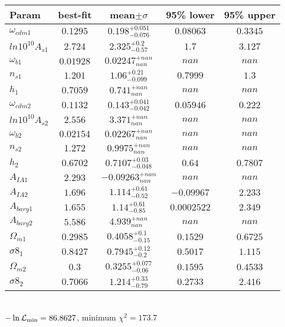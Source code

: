 \begin{tabular}{|l|c|c|c|c|} 
 \hline 
Param & best-fit & mean$\pm\sigma$ & 95\% lower & 95\% upper \\ \hline 
$\omega_{cdm 1 }$ &$0.1295$ & $0.198_{-0.076}^{+0.051}$ & $0.08063$ & $0.3345$ \\ 
$ln10^{10}A_{s 1 }$ &$2.724$ & $2.325_{-0.57}^{+0.2}$ & $1.7$ & $3.127$ \\ 
$\omega_{b 1 }$ &$0.01928$ & $0.02247_{nan}^{+nan}$ & $nan$ & $nan$ \\ 
$n_{s 1 }$ &$1.201$ & $1.06_{-0.099}^{+0.21}$ & $0.7999$ & $1.3$ \\ 
$h_{1 }$ &$0.7059$ & $0.741_{nan}^{+nan}$ & $nan$ & $nan$ \\ 
$\omega_{cdm 2 }$ &$0.1132$ & $0.143_{-0.042}^{+0.041}$ & $0.05946$ & $0.222$ \\ 
$ln10^{10}A_{s 2 }$ &$2.556$ & $3.371_{nan}^{+nan}$ & $nan$ & $nan$ \\ 
$\omega_{b 2 }$ &$0.02154$ & $0.02267_{nan}^{+nan}$ & $nan$ & $nan$ \\ 
$n_{s 2 }$ &$1.272$ & $0.9975_{nan}^{+nan}$ & $nan$ & $nan$ \\ 
$h_{2 }$ &$0.6702$ & $0.7107_{-0.048}^{+0.03}$ & $0.64$ & $0.7807$ \\ 
$A_{IA 1 }$ &$2.293$ & $-0.09263_{nan}^{+nan}$ & $nan$ & $nan$ \\ 
$A_{IA 2 }$ &$1.696$ & $1.114_{-0.52}^{+0.61}$ & $-0.09967$ & $2.233$ \\ 
$A_{bary 1 }$ &$1.655$ & $1.14_{-0.85}^{+0.61}$ & $0.0002522$ & $2.349$ \\ 
$A_{bary 2 }$ &$5.586$ & $4.939_{nan}^{+nan}$ & $nan$ & $nan$ \\ 
$\Omega_{m 1 }$ &$0.2985$ & $0.4058_{-0.15}^{+0.1}$ & $0.1529$ & $0.6725$ \\ 
$\sigma8_{1 }$ &$0.8427$ & $0.7945_{-0.2}^{+0.12}$ & $0.5017$ & $1.115$ \\ 
$\Omega_{m 2 }$ &$0.3$ & $0.3255_{-0.06}^{+0.077}$ & $0.1595$ & $0.4533$ \\ 
$\sigma8_{2 }$ &$0.7066$ & $1.214_{-0.79}^{+0.33}$ & $0.2733$ & $2.416$ \\ 
\hline 
 \end{tabular} \\ 
$-\ln{\cal L}_\mathrm{min} =86.8627$, minimum $\chi^2=173.7$ \\ 
